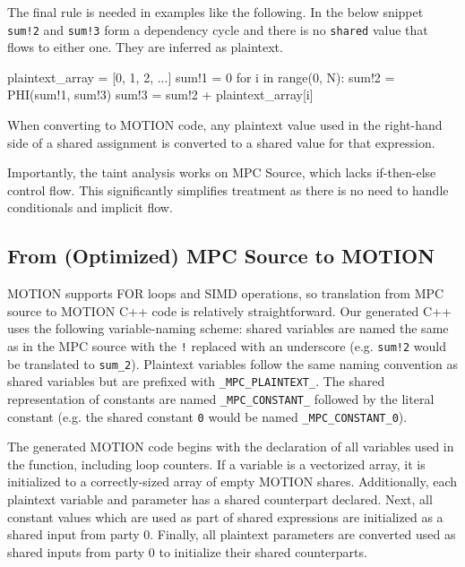 The final rule is needed in examples like the following. In the below snippet \texttt{sum!2} and \texttt{sum!3} form a dependency cycle and there is no \texttt{shared} value that flows to either one.
They are inferred as plaintext.
{\small
\begin{pythonn}
plaintext_array = [0, 1, 2, ...]
sum!1 = 0
for i in range(0, N):
    sum!2 = PHI(sum!1, sum!3)
    sum!3 = sum!2 + plaintext_array[i]
\end{pythonn}
}

When converting to MOTION code, any plaintext value used in the right-hand side of a shared assignment is converted to a shared value for that expression.

Importantly, the taint analysis works on MPC Source, which lacks if-then-else control flow.
This significantly simplifies treatment as there is no need to handle conditionals and implicit flow.

\subsection{From (Optimized) MPC Source to MOTION}
\label{sec:MOTION}

MOTION supports FOR loops and SIMD operations, so translation from MPC source to MOTION C++ code is relatively straightforward.
Our generated C++ uses the following variable-naming scheme: shared variables are named the same as in the MPC source with the \texttt{!} replaced with an underscore (e.g. \texttt{sum!2} would be translated to \texttt{sum\_2}).  Plaintext variables follow the same naming convention as shared variables but are prefixed with \texttt{\_MPC\_PLAINTEXT\_}.  The shared representation of constants are named \texttt{\_MPC\_CONSTANT\_} followed by the literal constant (e.g. the shared constant \texttt{0} would be named \texttt{\_MPC\_CONSTANT\_0}).

The generated MOTION code begins with the declaration of all variables used in the function, including loop counters.  If a variable is a vectorized array, it is initialized to a correctly-sized array of empty MOTION shares.  Additionally, each plaintext variable and parameter has a shared counterpart declared.  Next, all constant values which are used as part of shared expressions are initialized as a shared input from party 0.  Finally, all plaintext parameters are converted used as shared inputs from party 0 to initialize their shared counterparts.

